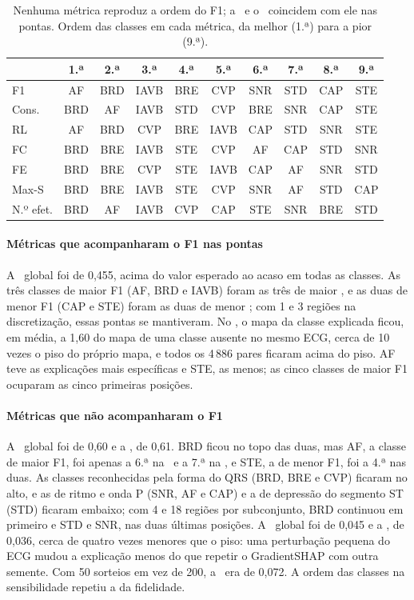 \begin{table}[!htb]\centering
\caption{Nenhuma métrica reproduz a ordem do F1; a \CS\ e o \RL\ coincidem com ele nas pontas. Ordem das classes em cada métrica, da melhor (1.ª) para a pior (9.ª).}\label{tab:ordens}
\setlength{\tabcolsep}{2.2pt}
\footnotesize
\begin{tabular}{lccccccccc}
\toprule
& 1.ª & 2.ª & 3.ª & 4.ª & 5.ª & 6.ª & 7.ª & 8.ª & 9.ª \\
\midrule
F1 & AF & BRD & IAVB & BRE & CVP & SNR & STD & CAP & STE \\
\midrule
Cons. & BRD & AF & IAVB & STD & CVP & BRE & SNR & CAP & STE \\
RL & AF & BRD & CVP & BRE & IAVB & CAP & STD & SNR & STE \\
FC & BRD & BRE & IAVB & STE & CVP & AF & CAP & STD & SNR \\
FE & BRD & BRE & CVP & STE & IAVB & CAP & AF & SNR & STD \\
Max-S & BRD & BRE & IAVB & STE & CVP & SNR & AF & STD & CAP \\
N.º efet. & BRD & AF & IAVB & CVP & CAP & STE & SNR & BRE & STD \\
\bottomrule
\end{tabular}
\end{table}

\paragraph{Métricas que acompanharam o F1 nas pontas} A \CS\ global foi de 0,455, acima do valor esperado ao acaso em todas as classes. As três classes de maior F1 (AF, BRD e IAVB) foram as três de maior \CS, e as duas de menor F1 (CAP e STE) foram as duas de menor \CS; com 1 e 3 regiões na discretização, essas pontas se mantiveram. No \RL, o mapa da classe explicada ficou, em média, a 1,60 do mapa de uma classe ausente no mesmo ECG, cerca de 10 vezes o piso do próprio mapa, e todos os 4\,886 pares ficaram acima do piso. AF teve as explicações mais específicas e STE, as menos; as cinco classes de maior F1 ocuparam as cinco primeiras posições.

\paragraph{Métricas que não acompanharam o F1} A \FC\ global foi de 0,60 e a \FE, de 0,61. BRD ficou no topo das duas, mas AF, a classe de maior F1, foi apenas a 6.ª na \FC\ e a 7.ª na \FE, e STE, a de menor F1, foi a 4.ª nas duas. As classes reconhecidas pela forma do QRS (BRD, BRE e CVP) ficaram no alto, e as de ritmo e onda P (SNR, AF e CAP) e a de depressão do segmento ST (STD) ficaram embaixo; com 4 e 18 regiões por subconjunto, BRD continuou em primeiro e STD e SNR, nas duas últimas posições. A \MS\ global foi de 0,045 e a \AS, de 0,036, cerca de quatro vezes menores que o piso: uma perturbação pequena do ECG mudou a explicação menos do que repetir o GradientSHAP com outra semente. Com 50 sorteios em vez de 200, a \MS\ era de 0,072. A ordem das classes na sensibilidade repetiu a da fidelidade.

